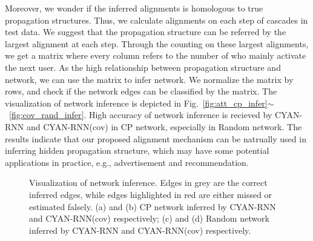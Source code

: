 Moreover, we wonder if
the inferred alignments is homologous to true propagation structures. Thus, we
calculate alignments on each step of cascades in test data. We suggest that the
propagation structure can be referred by the largest
alignment at each step. Through the counting on these largest
alignments, we get a matrix where every column refers to the number of who
mainly activate the next user. As the high relationship between propagation
structure and network, we can use the matrix to infer network. 
We normalize the matrix by rows, and check if the
network edges can be classified by the matrix. The visualization of network
inference is depicted in
Fig.~\ref{fig:att_cp_infer}$\sim$~\ref{fig:cov_rand_infer}. High
accuracy of network inference is recieved by CYAN-RNN and CYAN-RNN(cov) in
CP network, especially in Random network.
The results indicate that our
proposed alignment mechanism can be natrually used in inferring hidden
propagation structure, which may have some potential applications in practice,
e.g., advertisement and recommendation.


\begin{figure}
\centering
{}
\caption{Visualization of network inference. Edges in grey are the correct
inferred edges, while edges highlighted in red are either missed or estimated
falsely. (a) and (b) CP network inferred by CYAN-RNN and CYAN-RNN(cov)
respectively; (c) and (d) Random network inferred by CYAN-RNN and CYAN-RNN(cov)
respectively.
}
\end{figure}

